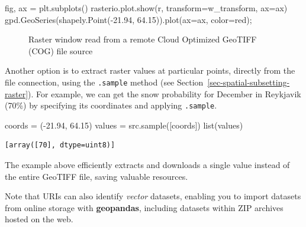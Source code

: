 \documentclass[
  letterpaper,
]{krantz}
\newenvironment{Shaded}{\begin{snugshade}}{\end{snugshade}}
\newcommand{\BuiltInTok}[1]{\textcolor[rgb]{0.00,0.23,0.31}{#1}}
\newcommand{\FloatTok}[1]{\textcolor[rgb]{0.68,0.00,0.00}{#1}}
\newcommand{\NormalTok}[1]{\textcolor[rgb]{0.00,0.23,0.31}{#1}}
\newcommand{\OperatorTok}[1]{\textcolor[rgb]{0.37,0.37,0.37}{#1}}
\newcommand{\StringTok}[1]{\textcolor[rgb]{0.13,0.47,0.30}{#1}}
\begin{document}
\begin{Shaded}
\begin{Highlighting}[]
\NormalTok{fig, ax }\OperatorTok{=}\NormalTok{ plt.subplots()}
\NormalTok{rasterio.plot.show(r, transform}\OperatorTok{=}\NormalTok{w\_transform, ax}\OperatorTok{=}\NormalTok{ax)}
\NormalTok{gpd.GeoSeries(shapely.Point(}\OperatorTok{{-}}\FloatTok{21.94}\NormalTok{, }\FloatTok{64.15}\NormalTok{)).plot(ax}\OperatorTok{=}\NormalTok{ax, color}\OperatorTok{=}\StringTok{\textquotesingle{}red\textquotesingle{}}\NormalTok{)}\OperatorTok{;}
\end{Highlighting}
\end{Shaded}

\begin{figure}[H]


\caption{\label{fig-raster-window}Raster window read from a remote Cloud
Optimized GeoTIFF (COG) file source}

\end{figure}%

Another option is to extract raster values at particular points,
directly from the file connection, using the \texttt{.sample} method
(see Section~\ref{sec-spatial-subsetting-raster}). For example, we can
get the snow probability for December in Reykjavik (70\%) by specifying
its coordinates and applying \texttt{.sample}.

\begin{Shaded}
\begin{Highlighting}[]
\NormalTok{coords }\OperatorTok{=}\NormalTok{ (}\OperatorTok{{-}}\FloatTok{21.94}\NormalTok{, }\FloatTok{64.15}\NormalTok{)}
\NormalTok{values }\OperatorTok{=}\NormalTok{ src.sample([coords])}
\BuiltInTok{list}\NormalTok{(values)}
\end{Highlighting}
\end{Shaded}

\begin{verbatim}
[array([70], dtype=uint8)]
\end{verbatim}

The example above efficiently extracts and downloads a single value
instead of the entire GeoTIFF file, saving valuable resources.

Note that URIs can also identify \emph{vector} datasets, enabling you to
import datasets from online storage with \textbf{geopandas}, including
datasets within ZIP archives hosted on the web.
\end{document}
